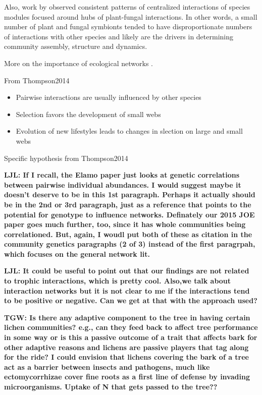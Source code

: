 \documentclass[11pt,twocolumn,twoside,lineno]{pnas-new}
\begin{document}
Also, work by \citep{Toju2017, Toju2016, Toju2014a} observed
consistent patterns of centralized interactions of species modules
focused around hubs of plant-fungal interactions. In other words, a
small number of plant and fungal symbionts tended to have
disproportionate numbers of interactions with other species and likely
are the drivers in determining community assembly, structure and
dynamics. 

More on the importance of ecological networks \cite{Guimaraes2011,
  Thompson2013a}.

From Thompson2014

\begin{itemize}
\item Pairwise interactions are usually influenced by other species
\item Selection favors the development of small webs
\item Evolution of new lifestyles leads to changes in slection on
  large and small webs
\end{itemize}

Specific hypothesis from Thompson2014

\textbf{LJL: If I recall, the Elamo paper just looks at genetic
  correlations between pairwise individual abundances. I would suggest
  maybe it doesn’t deserve to be in this 1st paragraph. Perhaps it
  actually should be in the 2nd or 3rd paragraph, just as a reference
  that points to the potential for genotype to influence
  networks. Definately our 2015 JOE paper goes much further, too,
  since it has whole communities being correlationed. But, again, I
  woudl put both of these as citation in the community genetics
  paragraphs (2 of 3) instead of the first paragrpah, which focuses on
  the general network lit.}


\textbf{LJL:  It could be useful to point out that our findings are
  not related to trophic interactions, which is pretty cool. Also,we
  talk about interaction networks but it is not clear to me if the
  interactions tend to be positive or negative. Can we get at that
  with the approach used?}


\textbf{TGW:  Is there any adaptive component to the tree in having
  certain lichen communities?  e.g., can they feed back to affect tree
  performance in some way or is this a passive outcome of a trait that
  affects bark for other adaptive reasons and lichens are passive
  players that tag along for the ride?  I could envision that lichens
  covering the bark of a tree act as a barrier between insects and
  pathogens, much like ectomycorrhizae cover fine roots as a first
  line of defense by invading microorganisms.  Uptake of N that gets
  passed to the tree??}
\end{document}
